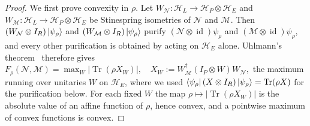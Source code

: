 \documentclass[11pt,letterpaper]{article}
\theoremstyle{plain}
\theoremstyle{plain}
\theoremstyle{plain}
\theoremstyle{plain}
\theoremstyle{plain}
\theoremstyle{plain}
\theoremstyle{plain}
\theoremstyle{definition}
\theoremstyle{plain}
\begin{document}
\begin{proof}
    We first prove convexity in $\rho$. Let $W_{\mathcal N}:\mathcal H_L\to\mathcal H_P\otimes\mathcal H_E$ and $W_{\mathcal M}:\mathcal H_L\to\mathcal H_P\otimes\mathcal H_E$ be Stinespring isometries of $\mathcal N$ and $\mathcal M$. Then $(W_{\mathcal N}\otimes I_R)\ket{\psi_\rho}$ and $(W_{\mathcal M}\otimes I_R)\ket{\psi_\rho}$ purify $(\mathcal N\otimes\operatorname{id})\psi_\rho$ and $(\mathcal M\otimes\operatorname{id})\psi_\rho$, and every other purification is obtained by acting on $\mathcal H_E$ alone. Uhlmann's theorem~\cite{KretschmannSchlingemannWerner2008} therefore gives
    $
        F_\rho(\mathcal N,\mathcal M)=\max_W\left|\operatorname{Tr}\left(\rho X_W\right)\right|,
        \quad
        X_W:=W_{\mathcal M}^\dagger\left(I_P\otimes W\right)W_{\mathcal N},
    $
    the maximum running over unitaries $W$ on $\mathcal H_E$, where we used $\bra{\psi_\rho}(X\otimes I_R)\ket{\psi_\rho}=\operatorname{Tr}(\rho X)$ for the purification below. 
    For each fixed $W$ the map $\rho\mapsto\left|\operatorname{Tr}(\rho X_W)\right|$ is the absolute value of an affine function of $\rho$, hence convex, and a pointwise maximum of convex functions is convex. 
    

\end{proof}
\end{document}
